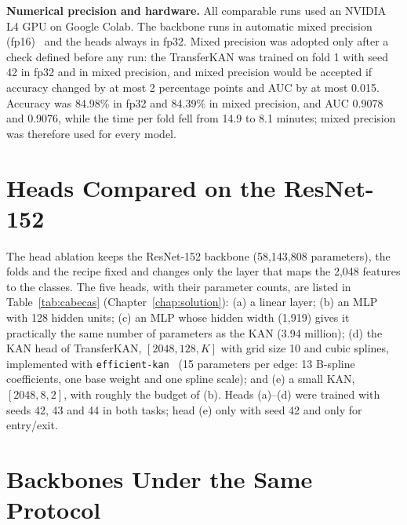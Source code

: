 \textbf{Numerical precision and hardware.} All comparable runs used an NVIDIA L4 GPU on Google Colab. The backbone runs in automatic mixed precision (fp16)~\cite{micikevicius2018mixed} and the heads always in fp32. Mixed precision was adopted only after a check defined before any run: the TransferKAN was trained on fold 1 with seed 42 in fp32 and in mixed precision, and mixed precision would be accepted if accuracy changed by at most 2 percentage points and AUC by at most 0.015. Accuracy was 84.98\% in fp32 and 84.39\% in mixed precision, and AUC 0.9078 and 0.9076, while the time per fold fell from 14.9 to 8.1 minutes; mixed precision was therefore used for every model.

\section{Heads Compared on the ResNet-152}
\label{sec:heads_setup}

The head ablation keeps the ResNet-152 backbone (58,143,808 parameters), the folds and the recipe fixed and changes only the layer that maps the 2,048 features to the classes. The five heads, with their parameter counts, are listed in Table~\ref{tab:cabecas} (Chapter~\ref{chap:solution}):
(a) a linear layer; (b) an MLP with 128 hidden units; (c) an MLP whose hidden width (1,919) gives it practically the same number of parameters as the KAN (3.94 million); (d) the KAN head of TransferKAN, $[2048, 128, K]$ with grid size 10 and cubic splines, implemented with \texttt{efficient-kan}~\cite{efficientkan} (15 parameters per edge: 13 B-spline coefficients, one base weight and one spline scale); and (e) a small KAN, $[2048, 8, 2]$, with roughly the budget of (b). Heads (a)--(d) were trained with seeds 42, 43 and 44 in both tasks; head (e) only with seed 42 and only for entry/exit.

\section{Backbones Under the Same Protocol}
\label{sec:backbones_setup}

